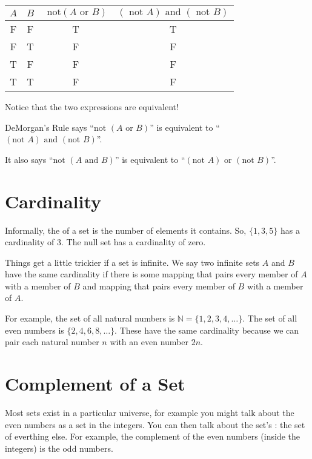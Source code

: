 \begin{Answer}[ref=logic_table]

\begin{tabular}{c | c | c | c}
  $A$ & $B$ & $\text{ not} \left(A \text{ or } B \right)$
  & $\left(\text{ not } A \right) \text{ and } \left(\text{ not } B \right)$ \\
  \hline
  F & F & T & T \\
  F & T & F & F \\
  T & F & F & F \\
  T & T & F & F \\
\end{tabular}

Notice that the two expressions are equivalent!

DeMorgan's Rule says ``$\text{not } \left(A \text{ or } B \right)$'' is
equivalent to ``$\left(\text{not } A \right) \text{ and } \left(\text{not } B
\right)$''.

It also says ``$\text{not } \left(A \text{ and } B \right)$'' is
equivalent to ``$\left(\text{not } A \right) \text{ or } \left(\text{not } B\right)$''.

\end{Answer}

\section{Cardinality}

Informally, the  of a set is the number of
elements it contains. So, $\{1,3,5\}$ has a cardinality of 3.  The
null set has a cardinality of zero.

Things get a little trickier if a set is infinite.  We say two
infinite sets $A$ and $B$ have the same cardinality if there is some
mapping that pairs every member of $A$ with a member of $B$ and
mapping that pairs every member of $B$ with a member of $A$.

For example, the set of all natural numbers is $\mathbb{N} = \{1,2,3,4,\dots\}$. The set of all even numbers is $\{2,4,6,8,\dots\}$. These have the same cardinality because we can pair each natural number $n$ with an even number $2n$. 

\section{Complement of a Set}

Most sets exist in a particular universe, for example you might talk
about the even numbers as a set in the integers. You can then talk
about the set's : the set of everthing else. For
example, the complement of the even numbers (inside the integers) is
the odd numbers.

